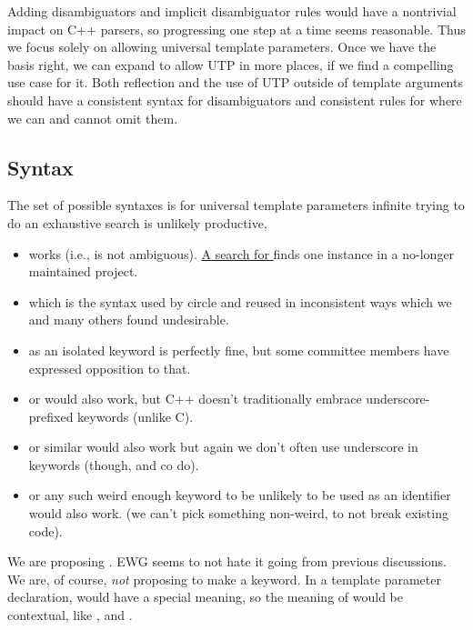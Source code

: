 \documentclass{wg21}
\begin{document}
Adding disambiguators and implicit disambiguator rules would have a nontrivial impact on C++ parsers, so progressing one step at a time seems reasonable.
Thus we focus solely on allowing universal template parameters. Once we have the basis right, we can expand to
allow UTP in more places, if we find a compelling use case for it. Both reflection and the use of UTP outside of template arguments should have a consistent syntax for disambiguators and consistent rules for where we can and cannot omit them.

\subsection{Syntax}

The set of possible syntaxes is for universal template parameters infinite trying to do an exhaustive search is unlikely productive,

\begin{itemize}

\item {} works (i.e., is not ambiguous). \href{https://tinyurl.com/pth8v9p7}{A search for }
finds one instance in a no-longer maintained project.

\item {} which is the syntax used by circle and  reused  in inconsistent ways
which we and many others found undesirable.

\item {} as an isolated keyword is perfectly fine, but some committee members have expressed opposition to that.

\item {} or  would also work, but C++ doesn't traditionally embrace underscore-prefixed keywords (unlike C).

\item {} or similar would also work but again we don't often use underscore in keywords (though,  and co do).

\item {} or any such weird enough keyword to be unlikely to be used as an identifier would also work. (we can't pick something non-weird, to not break existing code).

\end{itemize}

We are proposing . EWG seems to not hate it going from previous discussions.
We are, of course, \emph{not} proposing to make  a keyword.
In a template parameter declaration,  would have a special meaning, so the meaning of  would be
contextual, like ,  and .
\end{document}
